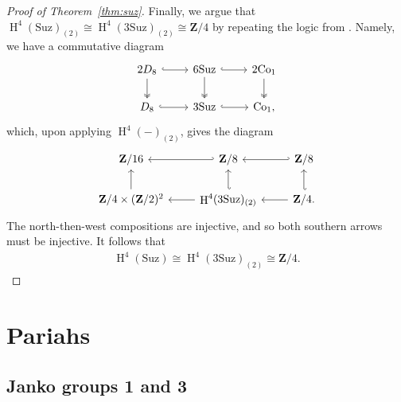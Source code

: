 \documentclass[pdftex]{sigma}
\numberwithin{equation}{section}
\newcommand\bZ{\mathbf Z}
\DeclareMathOperator\homology{H}
\renewcommand\H{\homology}
\newcommand\<\langle
\renewcommand\>\rangle
\newcommand\Co{\mathrm{Co}}
\newcommand\Suz{\mathrm{Suz}}
\begin{document}
\begin{proof}[Proof of Theorem~\ref{thm:suz}]
 Finally, we argue that $\H^4(\Suz)_{(2)} \cong \H^4(3\Suz)_{(2)} \cong \bZ/4$ by repeating the logic from \cite[Theorem 5.3]{jft}. Namely, we have a commutative diagram
 \[
 \begin{tikzcd}
 2D_8 \arrow[r,hook] \arrow[d,twoheadrightarrow] & 6\Suz \arrow[r,hook] \arrow[d,twoheadrightarrow] & 2\Co_1 \arrow[d,twoheadrightarrow] \\
 D_8 \arrow[r,hook] & 3\Suz \arrow[r,hook] & \Co_1,
 \end{tikzcd}
 \]
 which, upon applying $\H^4(-)_{(2)}$, gives the diagram
 \[ \begin{tikzcd}
 \bZ/16 & \bZ/8 \arrow[l,hook'] & \bZ/8 \arrow[l,hook'] \\
 \bZ/4 \times (\bZ/2)^2 \arrow[u] & \H^4(3\Suz)_{(2)} \arrow[u,hook'] \arrow[l] & \bZ/4. \arrow[u,hook'] \arrow[l]
 \end{tikzcd} \]
 The north-then-west compositions are injective, and so both southern arrows must be injective. It follows that
\begin{gather*} \H^4(\Suz) \cong \H^4(3\Suz)_{(2)} \cong \bZ/4.\tag*{\qed}
\end{gather*}\renewcommand{\qed}{}
\end{proof}

\section{Pariahs} \label{sec:pariahs}

\subsection{Janko groups 1 and 3}
\end{document}
